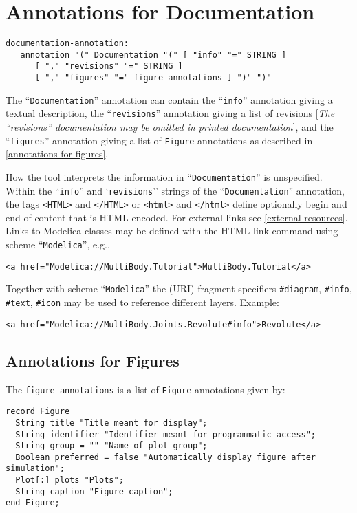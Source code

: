 \section{Annotations for Documentation}

\begin{lstlisting}[language=grammar]
documentation-annotation:
   annotation "(" Documentation "(" [ "info" "=" STRING ]
      [ "," "revisions" "=" STRING ]
      [ "," "figures" "=" figure-annotations ] ")" ")"
\end{lstlisting}
The ``\lstinline!Documentation!'' annotation can contain the ``\lstinline!info!'' annotation
giving a textual description, the ``\lstinline!revisions!'' annotation giving a list
of revisions {[}\emph{The
``revisions'' documentation may be omitted in printed documentation}{]}, and the
``\lstinline!figures!'' annotation giving a list of \lstinline!Figure! annotations as
 described in \autoref{annotations-for-figures}.

How the tool interprets the information in ``\lstinline!Documentation!'' is
unspecified. Within the ``\lstinline!info!'' and `\lstinline!revisions!'' strings of the ``\lstinline!Documentation!'' annotation, the
tags \lstinline!<HTML>! and \lstinline!</HTML>! or
\lstinline!<html>! and \lstinline!</html>! define
optionally begin and end of content that is HTML encoded. For external
links see \autoref{external-resources}. Links to Modelica classes may be defined with
the HTML link command using scheme ``\lstinline!Modelica!'', e.g.,

\begin{lstlisting}[language=modelica]
<a href="Modelica://MultiBody.Tutorial">MultiBody.Tutorial</a>
\end{lstlisting}

Together with scheme ``\lstinline!Modelica!'' the (URI) fragment specifiers
\lstinline!#diagram!, \lstinline!#info!, \lstinline!#text!, \lstinline!#icon! may be used to reference different
layers. Example:

\begin{lstlisting}[language=modelica]
<a href="Modelica://MultiBody.Joints.Revolute#info">Revolute</a>
\end{lstlisting}

\subsection{Annotations for Figures}
The \lstinline!figure-annotations! is a list of \lstinline!Figure! annotations given by:
\begin{lstlisting}[language=modelica]
record Figure
  String title "Title meant for display";
  String identifier "Identifier meant for programmatic access";
  String group = "" "Name of plot group";
  Boolean preferred = false "Automatically display figure after simulation";
  Plot[:] plots "Plots";
  String caption "Figure caption";
end Figure;
\end{lstlisting}

